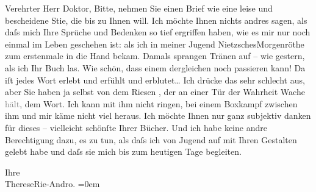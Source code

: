 \pstart{}Verehrter Herr Doktor,\pend\vspace{0.5em}
\pstart
           Bitte, nehmen Sie einen Brief wie eine leise und bescheidene Sti{\geminationm}e, die bis zu Ihnen will. Ich möchte Ihnen nichts
               andres sagen, als daſs mich Ihre Sprüche und
                  Bedenken so tief ergriffen haben, wie es mir nur noch einmal im Leben
               geschehen ist: als ich in meiner Jugend NietzschesMorgenröthe zum erstenmale
               in die Hand bekam. Damals sprangen Tränen auf – wie gestern, als ich Ihr Buch las. Wie schön, dass einem
               dergleichen noch passieren kann! Da iſt jedes Wort erlebt und erfühlt und erblutet{\dots} Ich drücke das sehr schlecht aus, aber Sie haben ja
               selbst von dem Riesen \label{K_L02568-1v}\label{K_L02568-1}, der an einer Tür der Wahrheit Wache
                  \textcolor{gray}{hält}, dem Wort. Ich kann mit ihm nicht ringen, bei einem
               Boxkampf zwischen ihm und mir käme nicht viel heraus. Ich möchte Ihnen nur ganz
               subjektiv danken für dieses – vielleicht schönſte Ihrer Bücher. Und ich habe keine
               andre Berechtigung dazu, es zu tun, als daſs ich von Jugend auf mit Ihren Gestalten
               gelebt habe und daſs sie mich bis zum heutigen Tage begleiten.\pend
           
\pstart
           Ihre{\\[\baselineskip]}\spacefill\mbox{ThereseRie-Andro.}\pend
           \leftskip=0em{}\endnumbering{}  
      